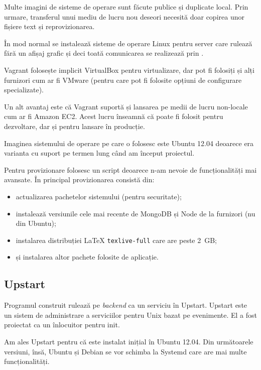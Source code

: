 \documentclass[a4wide,12pt]{report}
\newcommand{\eng}[1]{\emph{#1}} %
\newcommand{\cod}[1]{\texttt{#1}}
\newcommand{\acr}[1]{{\textsmaller[1]{\textsc{#1}}}} %
\begin{document}
Multe imagini de sisteme de operare sunt făcute publice și duplicate local. Prin
urmare, transferul unui mediu de lucru nou deseori necesită doar copirea unor
fișiere text și reprovizionarea.

În mod normal se instalează sisteme de operare Linux pentru server care rulează
fără un afișaj grafic și deci toată comunicarea se realizează prin \acr{SSH}.

Vagrant folosește implicit VirtualBox pentru virtualizare, dar pot fi folosiți
și alți furnizori cum ar fi VMware (pentru care pot fi folosite opțiuni de
configurare specializate).

Un alt avantaj este că Vagrant suportă și lansarea pe medii de lucru non-locale
cum ar fi Amazon EC2. Acest lucru înseamnă că poate fi folosit pentru
dezvoltare, dar și pentru lansare în producție.

Imaginea sistemului de operare pe care o folosesc este Ubuntu 12.04 deoarece era
varianta cu suport pe termen lung când am început proiectul.

Pentru provizionare folosesc un script deoarece n-am nevoie de funcționalități
mai avansate. În principal provizionarea consistă din:

\begin{itemize}

\item actualizarea pachetelor sistemului (pentru securitate);

\item instalează versiunile cele mai recente de MongoDB și Node de la furnizori
(nu din Ubuntu);

\item instalarea distribuției \LaTeX{} \cod{texlive-full} care are peste 2~GB;

\item și instalarea altor pachete folosite de aplicație.

\end{itemize}

\subsection{Upstart}

Programul construit rulează pe \eng{backend} ca un serviciu în Upstart. Upstart
este un sistem de administrare a serviciilor pentru Unix bazat pe evenimente. El
a fost proiectat ca un înlocuitor pentru init.

Am ales Upstart pentru că este instalat inițial în Ubuntu 12.04. Din următoarele
versiuni, însă, Ubuntu și Debian se vor schimba la Systemd care are mai multe
funcționalități.
\end{document}
